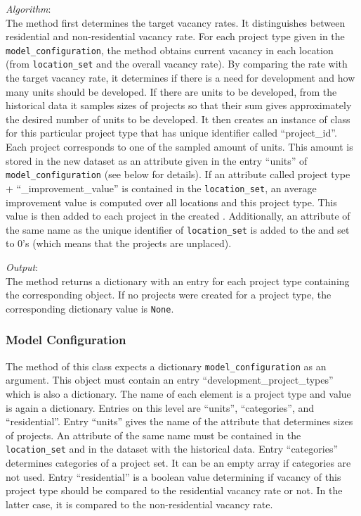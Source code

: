 {\it Algorithm}:~\\[1mm]
The method first determines the target vacancy rates. It distinguishes between
residential and non-residential vacancy rate.  For each project type given in
the \verb|model_configuration|, the method obtains current vacancy in each
location (from \verb|location_set| and the overall vacancy rate). By comparing
the rate with the target vacancy rate, it determines if there is a need for
development and how many units should be developed. If there are units to be
developed, from the historical data it samples sizes of projects so that their
sum gives approximately the desired number of units to be developed. It then
creates an instance of class  for this particular
project type that has unique identifier called ``project_id''. Each project
corresponds to one of the sampled amount of units. This amount is stored in
the new dataset as an attribute given in the entry ``units'' of
\verb|model_configuration| (see below for details). If an attribute called
project type + ``_improvement_value'' is contained in the \verb|location_set|,
an average improvement value is computed over all locations and this project
type. This value is then added to each project in the created
.  Additionally, an attribute of the same name as
the unique identifier of \verb|location_set| is added to the
 and set to 0's (which means that the projects
are unplaced).

{\it Output}:~\\[1mm]
The method returns a dictionary with an entry for each project type containing
the corresponding  object. If no projects were
created for a project type, the corresponding dictionary value is \verb|None|.


\subsubsection{Model Configuration}
\label{sec:DPTM-configuration}
The  method of this class expects a dictionary
\verb|model_configuration| as an argument. This object must contain an entry
``development_project_types'' which is also a dictionary. The name of each
element is a project type and value is again a dictionary. Entries on this
level are ``units'', ``categories'', and ``residential''. Entry ``units''
gives the name of the attribute that determines sizes of projects. An
attribute of the same name must be contained in the \verb|location_set| and in
the dataset with the historical data. Entry ``categories'' determines
categories of a project set. It can be an empty array if categories are not
used. Entry ``residential'' is a boolean value determining if vacancy of this
project type should be compared to the residential vacancy rate or not. In the
latter case, it is compared to the non-residential vacancy rate.


